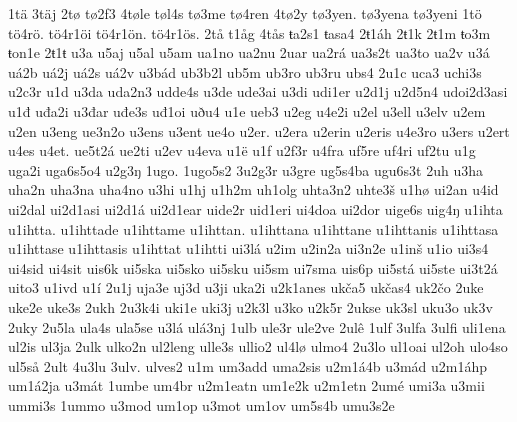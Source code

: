 {    1tä
    3täj
    2tø
    tø2f3
    4tøle
    tøl4s
    tø3me
    tø4ren
    4tø2y
    tø3yen.
    tø3yena
    tø3yeni
    1tö
    tö4rö.
    tö4r1öi
    tö4r1ön.
    tö4r1ös.
    2tå
    t1åg
    4tås
    ŧa2s1
    ŧasa4
    2ŧ1áh
    2ŧ1k
    2ŧ1m
    ŧo3m
    ŧon1e
    2ŧ1ŧ
    u3a
    u5aj
    u5al
    u5am
    ua1no
    ua2nu
    2uar
    ua2rá
    ua3s2t
    ua3to
    ua2v
    u3á
    uá2b
    uá2j
    uá2s
    uá2v
    u3bád
    ub3b2l
    ub5m
    ub3ro
    ub3ru
    ubs4
    2u1c
    uca3
    uchi3s
    u2c3r
    u1d
    u3da
    uda2n3
    udde4s
    u3de
    ude3ai
    u3di
    udi1er
    u2d1j
    u2d5n4
    udoi2d3asi
    u1đ
    uđa2i
    u3đar
    uđe3s
    uđ1oi
    uðu4
    u1e
    ueb3
    u2eg
    u4e2i
    u2el
    u3ell
    u3elv
    u2em
    u2en
    u3eng
    ue3n2o
    u3ens
    u3ent
    ue4o
    u2er.
    u2era
    u2erin
    u2eris
    u4e3ro
    u3ers
    u2ert
    u4es
    u4et.
    ue5t2á
    ue2ti
    u2ev
    u4eva
    u1ë
    u1f
    u2f3r
    u4fra
    uf5re
    uf4ri
    uf2tu
    u1g
    uga2i
    uga6s5o4
    u2g3ŋ
    1ugo.
    1ugo5s2
    3u2g3r
    u3gre
    ug5s4ba
    ugu6s3t
    2uh
    u3ha
    uha2n
    uha3na
    uha4no
    u3hi
    u1hj
    u1h2m
    uh1olg
    uhta3n2
    uhte3š
    u1hø
    ui2an
    u4id
    ui2dal
    ui2d1asi
    ui2d1á
    ui2d1ear
    uide2r
    uid1eri
    ui4doa
    ui2dor
    uige6s
    uig4ŋ
    u1ihta
    u1ihtta.
    u1ihttade
    u1ihttame
    u1ihttan.
    u1ihttana
    u1ihttane
    u1ihttanis
    u1ihttasa
    u1ihttase
    u1ihttasis
    u1ihttat
    u1ihtti
    ui3lá
    u2im
    u2in2a
    ui3n2e
    u1inš
    u1io
    ui3s4
    ui4sid
    ui4sit
    uis6k
    ui5ska
    ui5sko
    ui5sku
    ui5sm
    ui7sma
    uis6p
    ui5stá
    ui5ste
    ui3t2á
    uito3
    u1ivd
    u1í
    2u1j
    uja3e
    uj3d
    u3ji
    uka2i
    u2k1anes
    ukča5
    ukčas4
    uk2čo
    2uke
    uke2e
    uke3s
    2ukh
    2u3k4i
    uki1e
    uki3j
    u2k3l
    u3ko
    u2k5r
    2ukse
    uk3sl
    uku3o
    uk3v
    2uky
    2u5la
    ula4s
    ula5se
    u3lá
    ulá3nj
    1ulb
    ule3r
    ule2ve
    2ulê
    1ulf
    3ulfa
    3ulfi
    uli1ena
    ul2is
    ul3ja
    2ulk
    ulko2n
    ul2leng
    ulle3s
    ullio2
    ul4lø
    ulmo4
    2u3lo
    ul1oai
    ul2oh
    ulo4so
    ul5så
    2ult
    4u3lu
    3ulv.
    ulves2
    u1m
    um3add
    uma2sis
    u2m1á4b
    u3mád
    u2m1áhp
    um1á2ja
    u3mát
    1umbe
    um4br
    u2m1eatn
    um1e2k
    u2m1etn
    2umé
    umi3a
    u3mii
    ummi3s
    1ummo
    u3mod
    um1op
    u3mot
    um1ov
    um5s4b
    umu3s2e
}
